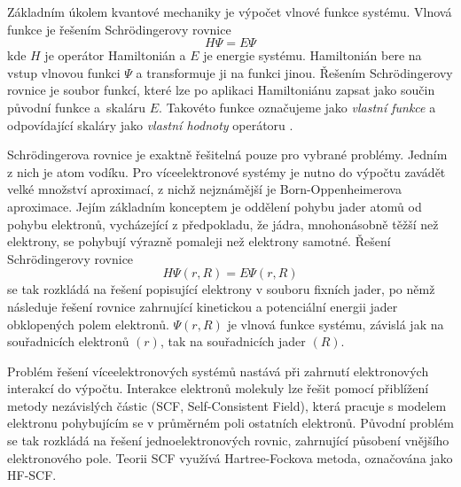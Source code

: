 Základním úkolem kvantové mechaniky je výpočet vlnové funkce systému.
Vlnová funkce je řešením Schrödingerovy rovnice $$ H\Psi = E\Psi$$ kde $H$ je operátor Hamiltonián a $E$
 je energie systému. Hamiltonián bere na vstup vlnovou funkci $\Psi$ a transformuje ji na funkci jinou. Řešením Schrödingerovy rovnice je soubor funkcí, které lze po aplikaci Hamiltoniánu zapsat jako součin původní funkce a~skaláru $E$. Takovéto funkce označujeme jako \textit{vlastní funkce} a odpovídající skaláry jako \textit{vlastní hodnoty} operátoru \cite{Volatron}. 
 
 Schrödingerova rovnice je exaktně řešitelná pouze pro vybrané problémy. Jedním z nich je atom vodíku. Pro víceelektronové systémy je nutno do výpočtu zavádět velké množství aproximací, z nichž nejznámější je Born-Oppenheimerova aproximace. %
 Jejím základním konceptem je oddělení pohybu jader atomů od pohybu elektronů, vycházející z předpokladu, že jádra, mnohonásobně těžší než elektrony,
 se pohybují výrazně pomaleji než elektrony samotné. Řešení Schrödingerovy rovnice $$H\Psi(r, R) = E\Psi(r, R)$$se tak rozkládá na řešení popisující elektrony v souboru fixních jader, po němž následuje řešení rovnice zahrnující kinetickou a potenciální energii jader obklopených polem elektronů. $\Psi(r, R)$ je vlnová funkce systému, závislá jak na souřadnicích elektronů $(r)$, tak na souřadnicích jader $(R)$.
 
Problém řešení víceelektronových systémů nastává při zahrnutí elektronových interakcí do výpočtu. Interakce elektronů molekuly lze řešit pomocí přiblížení metody nezávislých částic (SCF, Self-Consistent Field), která pracuje s modelem elektronu pohybujícím se v průměrném poli ostatních elektronů. Původní problém se tak rozkládá na řešení jednoelektronových rovnic, zahrnující působení vnějšího elektronového pole. Teorii SCF využívá Hartree-Fockova metoda, označována jako HF-SCF. 
 
